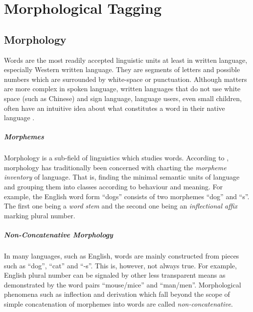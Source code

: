 \chapter{Morphological Tagging}

\section{Morphology}

Words are the most readily accepted linguistic units at least in
written language, especially Western written language. They are
segments of letters and possible numbers which are surrounded by
white-space or punctuation. Although matters are more complex in
spoken language, written languages that do not use white space (such
as Chinese) and sign language, language users, even small children,
often have an intuitive idea about what constitutes a word in their
native language \cite{someone}.

\paragraph{Morphemes} Morphology is a sub-field of linguistics which
studies words. According to \cite{Bybee85}, morphology has
traditionally been concerned with charting the {\it morpheme
  inventory} of language. That is, finding the minimal semantic units
of language and grouping them into classes according to behaviour and
meaning. For example, the English word form ``dogs'' consists of two
morphemes ``dog'' and ``s''. The first one being a {\it word stem}
and the second one being an {\it inflectional affix} marking plural
number.

\paragraph{Non-Concatenative Morphology} In many languages, such as
English, words are mainly constructed from pieces such as ``dog'',
``cat'' and ``-s''. This is, however, not always true. For example,
English plural number can be signaled by other less transparent means
as demonstrated by the word pairs ``mouse/mice'' and
``man/men''. Morphological phenomena such as inflection and derivation
which fall beyond the scope of simple concatenation of morphemes into
words are called {\it non-concatenative}. 

